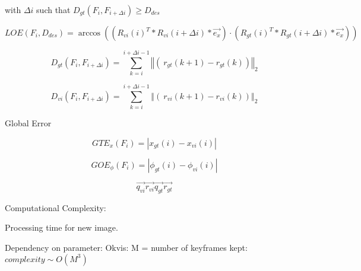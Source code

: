 with $ \Delta i $ such that $ D_{gt} \left( F_i, F_{i+\Delta i} \right) \geq D_{des} $

\begin{equation}
LOE \left( F_i, D_{des} \right) = \arccos \left(\left( R_{vi} \left(i\right)^T * R_{vi} \left(i+\Delta i\right) * \vec{e_{x}} \right) \cdot \left( R_{gt} \left(i\right)^T * R_{gt} \left(i+\Delta i\right) * \vec{e_{x}} \right)\right)
\end{equation}

\begin{equation}
       D_{gt} \left( F_i, F_{i+\Delta i} \right) = \sum_{k=i}^{i+\Delta i-1} \left\Vert\left(\ r_{gt} \left( k+1 \right) - r_{gt} \left( k \right) \right) \right\Vert_2
\end{equation}

\begin{equation}
       D_{vi} \left( F_i, F_{i+\Delta i} \right) = \sum_{k=i}^{i+\Delta i-1} \left\Vert\left(\ r_{vi} \left( k+1 \right) - r_{vi} \left( k \right) \right) \right\Vert_2
\end{equation}



Global Error

\begin{equation}
GTE_x \left( F_i \right) = \left|x_{gt} \left( i \right) - x_{vi} \left( i \right)\right|
\end{equation}

\begin{equation}
GOE_{\phi} \left( F_i \right) = \left| \phi_{gt} \left( i \right) - \phi_{vi} \left( i \right)\right|
\end{equation}






\begin{equation}
       \vec{q_{vi}} \vec{r_{vi}} \vec{q_{gt}} \vec{r_{gt}}
\end{equation}

Computational Complexity:

Processing time for new image.

Dependency on parameter:
Okvis: M = number of keyframes kept: $ complexity \sim O(M^3) $










